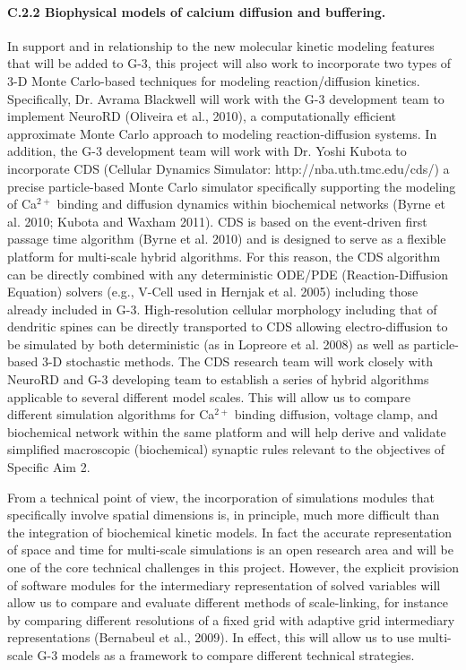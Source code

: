 \documentclass[12pt]{article}
\begin{document}
\paragraph{C.2.2 Biophysical models of calcium diffusion and buffering.} In support and in relationship to the new molecular kinetic modeling features that will be added to G-3, this project will also work to incorporate two types of 3-D Monte Carlo-based techniques for modeling reaction/diffusion kinetics. Specifically, Dr. Avrama Blackwell will work with the G-3 development team to implement NeuroRD (Oliveira et al., 2010), a computationally efficient approximate Monte Carlo approach to modeling reaction-diffusion systems. In addition, the G-3 development team will work with Dr. Yoshi Kubota to incorporate CDS (Cellular Dynamics Simulator: http://nba.uth.tmc.edu/cds/) a precise particle-based Monte Carlo simulator specifically supporting the modeling of Ca$^{2+}$ binding and diffusion dynamics within biochemical networks (Byrne et al. 2010; Kubota and Waxham 2011). CDS is based on the event-driven first passage time algorithm (Byrne et al. 2010) and is designed to serve as a flexible platform for multi-scale hybrid algorithms. For this reason, the CDS algorithm can be directly combined with any deterministic ODE/PDE (Reaction-Diffusion Equation) solvers (e.g., V-Cell used in Hernjak et al. 2005) including those already included in G-3. High-resolution cellular morphology including that of dendritic spines can be directly transported to CDS allowing electro-diffusion to be simulated by both deterministic (as in Lopreore et al. 2008) as well as particle-based 3-D stochastic methods. The CDS research team will work closely with NeuroRD and G-3 developing team to establish a series of hybrid algorithms applicable to several different model scales. This will allow us to compare different simulation algorithms for Ca$^{2+}$ binding diffusion, voltage clamp, and biochemical network within the same platform and will help derive and validate simplified macroscopic (biochemical) synaptic rules relevant to the objectives of Specific Aim 2.

From a technical point of view, the incorporation of
simulations modules that specifically involve spatial dimensions is,
in principle, much more difficult than the integration of biochemical
kinetic models. In fact the accurate representation of space and time
for multi-scale simulations is an open research area and will be one
of the core technical challenges in this project. However, the
explicit provision of software modules for the intermediary
representation of solved variables will allow us to compare and
evaluate different methods of scale-linking, for instance by comparing
different resolutions of a fixed grid with adaptive grid intermediary
representations (Bernabeul et al., 2009). In effect, this will allow
us to use multi-scale G-3 models as a framework to compare different
technical strategies.
\end{document}
